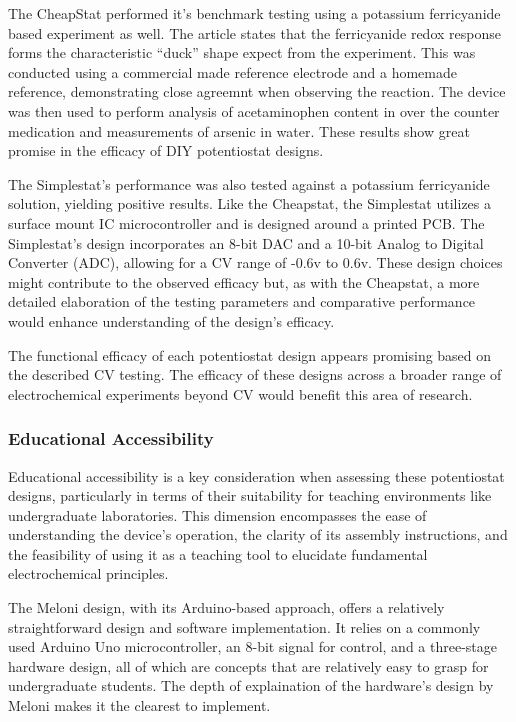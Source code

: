 \documentclass{article}
\begin{document}
The CheapStat performed it's benchmark testing using a potassium ferricyanide based experiment as well. The article states that the ferricyanide redox response forms the characteristic ``duck'' shape expect from the experiment. This was conducted using a commercial made reference electrode and a homemade reference, demonstrating close agreemnt when observing the reaction. The device was then used to perform analysis of acetaminophen content in over the counter medication and measurements of arsenic in water. These results show great promise in the efficacy of DIY potentiostat designs.

The Simplestat's performance was also tested against a potassium ferricyanide solution, yielding positive results. Like the Cheapstat, the Simplestat utilizes a surface mount IC microcontroller and is designed around a printed PCB. The Simplestat's design incorporates an 8-bit DAC and a 10-bit Analog to Digital Converter (ADC), allowing for a CV range of -0.6v to 0.6v. These design choices might contribute to the observed efficacy but, as with the Cheapstat, a more detailed elaboration of the testing parameters and comparative performance would enhance understanding of the design's efficacy.

The functional efficacy of each potentiostat design appears promising based on the described CV testing. The efficacy of these designs across a broader range of electrochemical experiments beyond CV would benefit this area of research.

\subsubsection*{Educational Accessibility}
Educational accessibility is a key consideration when assessing these potentiostat designs, particularly in terms of their suitability for teaching environments like undergraduate laboratories. This dimension encompasses the ease of understanding the device's operation, the clarity of its assembly instructions, and the feasibility of using it as a teaching tool to elucidate fundamental electrochemical principles.

The Meloni design, with its Arduino-based approach, offers a relatively straightforward design and software implementation. It relies on a commonly used Arduino Uno microcontroller, an 8-bit signal for control, and a three-stage hardware design, all of which are concepts that are relatively easy to grasp for undergraduate students. The depth of explaination of the hardware's design by Meloni makes it the clearest to implement.
\end{document}
